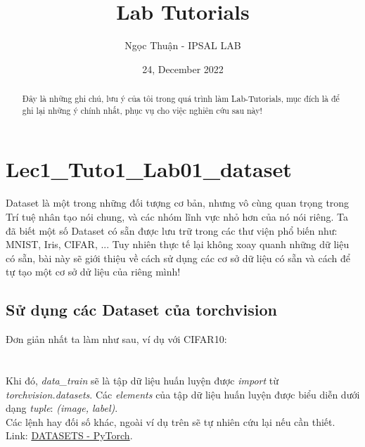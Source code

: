 \documentclass{article}
\title{Lab Tutorials}
\author{Ngọc Thuận - IPSAL LAB}
\date{24, December 2022}
\begin{document}
\maketitle
\begin{abstract}
    Đây là những ghi chú, lưu ý của tôi trong quá trình làm Lab-Tutorials, mục đích là để ghi lại những ý chính nhất, phục vụ cho việc nghiên cứu sau này!
\end{abstract}

\section{Lec1\_Tuto1\_Lab01\_dataset}
    Dataset là một trong những đối tượng cơ bản, nhưng vô cùng quan trọng trong Trí tuệ nhân tạo nói chung, và các nhóm lĩnh vực nhỏ hơn của nó nói riêng. Ta đã biết một số Dataset có sẵn được lưu trữ trong các thư viện phổ biến như: MNIST, Iris, CIFAR, ... Tuy nhiên thực tế lại không xoay quanh những dữ liệu có sẵn, bài này sẽ giới thiệu về cách sử dụng các cơ sở dữ liệu có sẵn và cách để tự tạo một cơ sở dử liệu của riêng mình!
    \subsection{Sử dụng các Dataset của torchvision}
    Đơn giản nhất ta làm như sau, ví dụ với CIFAR10:\newline \\
    \\ \\
    Khi đó, \textit{data\_train} sẽ là tập dữ liệu huấn luyện được \textit{import} từ \textit{torchvision.datasets}. Các \textit{elements} của tập dữ liệu huấn luyện được biểu diễn dưới dạng \textit{tuple}: \textit{(image, label)}.\\
    Các lệnh hay đối số khác, ngoài ví dụ trên sẽ tự nhiên cứu lại nếu cần thiết.\\
    Link: \href{https://pytorch.org/vision/stable/datasets.html}{DATASETS - PyTorch}.
\end{document}
